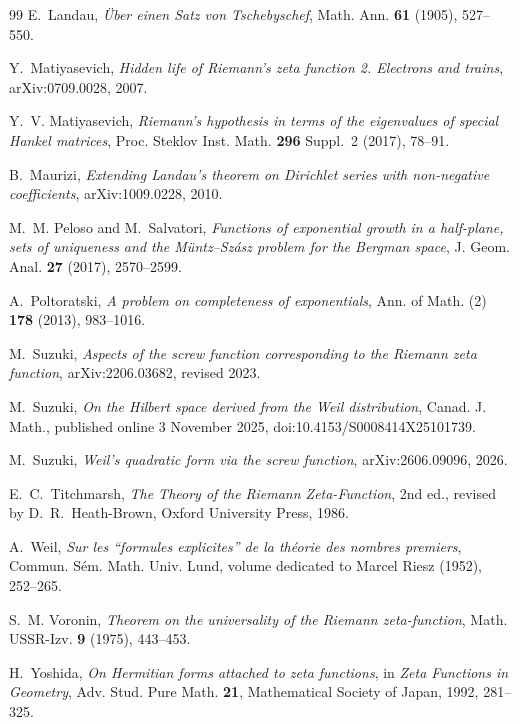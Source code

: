 \documentclass[11pt]{article}
\begin{document}
\begin{thebibliography}{99}
E.~Landau,
\emph{\"Uber einen Satz von Tschebyschef},
Math. Ann. \textbf{61} (1905), 527--550.

Y.~Matiyasevich,
\emph{Hidden life of Riemann's zeta function 2. Electrons and trains},
arXiv:0709.0028, 2007.

Y.~V. Matiyasevich,
\emph{Riemann's hypothesis in terms of the eigenvalues of special Hankel matrices},
Proc. Steklov Inst. Math. \textbf{296} Suppl.~2 (2017), 78--91.

B.~Maurizi,
\emph{Extending Landau's theorem on Dirichlet series with non-negative coefficients},
arXiv:1009.0228, 2010.

M.~M. Peloso and M.~Salvatori,
\emph{Functions of exponential growth in a half-plane, sets of uniqueness and the
M\"untz--Sz\'asz problem for the Bergman space},
J. Geom. Anal. \textbf{27} (2017), 2570--2599.

A.~Poltoratski,
\emph{A problem on completeness of exponentials},
Ann. of Math. (2) \textbf{178} (2013), 983--1016.

M.~Suzuki,
\emph{Aspects of the screw function corresponding to the Riemann zeta function},
arXiv:2206.03682, revised 2023.

M.~Suzuki,
\emph{On the Hilbert space derived from the Weil distribution},
Canad. J. Math., published online 3 November 2025,
doi:10.4153/S0008414X25101739.

M.~Suzuki,
\emph{Weil's quadratic form via the screw function},
arXiv:2606.09096, 2026.

E.~C.~Titchmarsh,
\emph{The Theory of the Riemann Zeta-Function}, 2nd ed., revised by D.~R.~Heath-Brown,
Oxford University Press, 1986.

A.~Weil,
\emph{Sur les ``formules explicites'' de la th\'eorie des nombres premiers},
Commun. S\'em. Math. Univ. Lund, volume dedicated to Marcel Riesz (1952), 252--265.

S.~M. Voronin,
\emph{Theorem on the universality of the Riemann zeta-function},
Math. USSR-Izv. \textbf{9} (1975), 443--453.

H.~Yoshida,
\emph{On Hermitian forms attached to zeta functions},
in \emph{Zeta Functions in Geometry}, Adv. Stud. Pure Math. \textbf{21},
Mathematical Society of Japan, 1992, 281--325.

\end{thebibliography}
\end{document}
